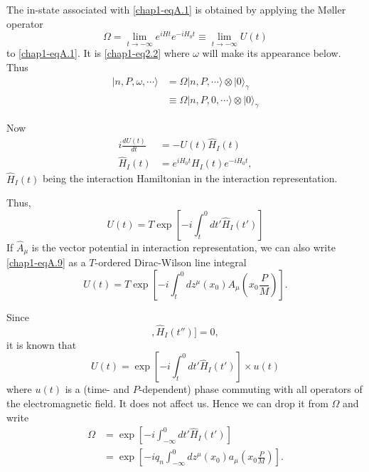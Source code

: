 The in-state associated with \eqref{chap1-eqA.1} is obtained by applying the M\o{}ller operator
\begin{equation*}
\Omega = \lim\limits_{t \to -\infty} e^{iHt}e^{-iH_0t}\equiv \lim\limits_{t \to -\infty} U(t)\label{chap1-eqA.6}\tag{A.6}
\end{equation*}
to \eqref{chap1-eqA.1}. It is \eqref{chap1-eq2.2} where $\omega$ will make its appearance below. Thus
\begin{align*}
  | n, P, \omega, \cdots \rangle & = \Omega | n, P, \cdots \rangle \otimes | 0 \rangle_\gamma\\
  & \equiv \Omega|n, P, 0, \cdots \rangle \otimes |0 \rangle_\gamma \label{chap1-eqA.7}\tag{A.7}
\end{align*}

Now
\begin{align*}
  i \frac{dU(t)}{dt} & = -U (t) \hat{H}_I(t)\\
  \hat{H}_I (t) & = e^{iH_0t} H_I (t) e^{-iH_0t}, \label{chap1-eqA.8}\tag{A.8}
\end{align*}
$\hat{H}_I(t)$ being the interaction Hamiltonian in the interaction representation.

Thus,
\begin{equation*}
U(t)= T\exp \left[-i \int^0_t dt' \hat{H}_I (t') \right]\label{chap1-eqA.9}\tag{A.9}
\end{equation*}
If $\hat{A}_\mu$ is the vector potential in interaction representation, we can also write \eqref{chap1-eqA.9} as a $T$-ordered Dirac-Wilson line integral
\begin{equation*}
U(t) = T \exp \left[-i \int^0_t dz^\mu (x_0) A_\mu  \left( x_0 \frac{P}{M}\right)\right]. \label{chap1-eqA.10}\tag{A.10}
\end{equation*}

Since
\begin{equation*}
  [[\hat{H}_I (t), \hat{H}_I(t')], \hat{H}_I (t'')]=0, \label{chap1-eqA.11}\tag{A.11}
\end{equation*}
it is known that \cite{key14}
\begin{equation*}
U(t) = \exp \left[ -i \int^0_t dt' \hat{H}_I (t')\right] \times u(t) \label{chap1-eqA.12}\tag{A.12}
\end{equation*}
where $u(t)$ is a (time- and $P$-dependent) phase commuting with all operators of the electromagnetic field. It does not affect us. Hence we can drop it from $\Omega$ and write
\begin{align*}
  \Omega & = \exp \left[-i \int^0_{-\infty} dt' \hat{H}_I (t') \right] \label{chap1-eqA.13}\tag{A.13}\\
  & = \exp \left[ -iq_n \int^0_{-\infty} dz^\mu (x_0) a_\mu \left( x_0 \frac{P}{M}\right)\right]. \label{chap1-eqA.14}\tag{A.14}
\end{align*}

